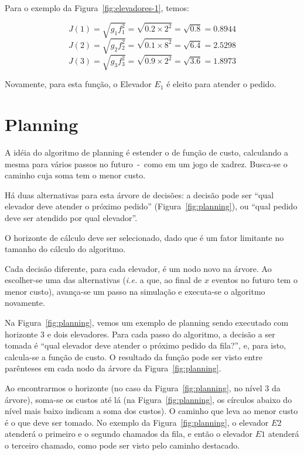 Para o exemplo da Figura~\ref{fig:elevadores-1}, temos:

\[J(1) = \sqrt{g_{1}f_{1}^{2}} = \sqrt{0.2 \times 2^2} = \sqrt{0.8} = 0.8944\]
\[J(2) = \sqrt{g_{2}f_{2}^{2}} = \sqrt{0.1 \times 8^2} = \sqrt{6.4} = 2.5298\]
\[J(3) = \sqrt{g_{3}f_{3}^{2}} = \sqrt{0.9 \times 2^2} = \sqrt{3.6} = 1.8973\]

Novamente, para esta função, o Elevador $E_{1}$ é eleito para atender o pedido.

\section{Planning}


A idéia do algoritmo de planning é estender o de função de custo, calculando a
mesma para vários passos no futuro~-~como em um jogo de xadrez. Busca-se o
caminho cuja soma tem o menor custo.

Há duas alternativas para esta árvore de decisões: a decisão pode ser ``qual
elevador deve atender o próximo pedido'' (Figura~\ref{fig:planning}),
ou ``qual pedido deve ser atendido por qual elevador''. %

O horizonte de cálculo deve ser selecionado, dado que é um fator limitante no
tamanho do cálculo do algoritmo.

Cada decisão diferente, para cada elevador, é um nodo novo na árvore. Ao
escolher-se uma das alternativas (\textit{i.e.} a que, ao final de $x$ eventos
no futuro tem o menor custo), avança-se um passo na simulação e executa-se o
algoritmo novamente.

Na Figura~\ref{fig:planning}, vemos um exemplo de planning sendo executado com
horizonte 3 e dois elevadores. Para cada passo do algoritmo, a decisão a ser
tomada é ``qual elevador deve atender o próximo pedido da fila?'', e, para isto,
calcula-se a função de custo. O resultado da função pode ser visto entre
parênteses em cada nodo da árvore da Figura~\ref{fig:planning}.

Ao encontrarmos o horizonte (no caso da Figura~\ref{fig:planning}, no nível 3 da
árvore), soma-se os custos até lá (na Figura~\ref{fig:planning}, os círculos
abaixo do nível mais baixo indicam a soma dos custos). O caminho que leva ao
menor custo é o que deve ser tomado. No exemplo da Figura~\ref{fig:planning}, o
elevador $E2$ atenderá o primeiro e o segundo chamados da fila, e então o
elevador $E1$ atenderá o terceiro chamado, como pode ser visto pelo caminho destacado.

